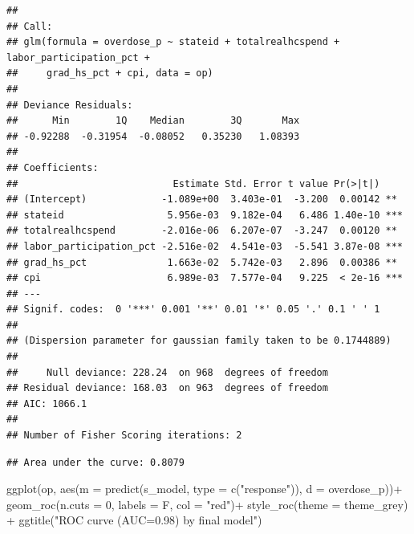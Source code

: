 \documentclass[
]{article}
\newenvironment{Shaded}{\begin{snugshade}}{\end{snugshade}}
\newcommand{\AttributeTok}[1]{\textcolor[rgb]{0.77,0.63,0.00}{#1}}
\newcommand{\DecValTok}[1]{\textcolor[rgb]{0.00,0.00,0.81}{#1}}
\newcommand{\FunctionTok}[1]{\textcolor[rgb]{0.00,0.00,0.00}{#1}}
\newcommand{\NormalTok}[1]{#1}
\newcommand{\OtherTok}[1]{\textcolor[rgb]{0.56,0.35,0.01}{#1}}
\newcommand{\SpecialCharTok}[1]{\textcolor[rgb]{0.00,0.00,0.00}{#1}}
\newcommand{\StringTok}[1]{\textcolor[rgb]{0.31,0.60,0.02}{#1}}
\begin{document}
\begin{verbatim}
## 
## Call:
## glm(formula = overdose_p ~ stateid + totalrealhcspend + labor_participation_pct + 
##     grad_hs_pct + cpi, data = op)
## 
## Deviance Residuals: 
##      Min        1Q    Median        3Q       Max  
## -0.92288  -0.31954  -0.08052   0.35230   1.08393  
## 
## Coefficients:
##                           Estimate Std. Error t value Pr(>|t|)    
## (Intercept)             -1.089e+00  3.403e-01  -3.200  0.00142 ** 
## stateid                  5.956e-03  9.182e-04   6.486 1.40e-10 ***
## totalrealhcspend        -2.016e-06  6.207e-07  -3.247  0.00120 ** 
## labor_participation_pct -2.516e-02  4.541e-03  -5.541 3.87e-08 ***
## grad_hs_pct              1.663e-02  5.742e-03   2.896  0.00386 ** 
## cpi                      6.989e-03  7.577e-04   9.225  < 2e-16 ***
## ---
## Signif. codes:  0 '***' 0.001 '**' 0.01 '*' 0.05 '.' 0.1 ' ' 1
## 
## (Dispersion parameter for gaussian family taken to be 0.1744889)
## 
##     Null deviance: 228.24  on 968  degrees of freedom
## Residual deviance: 168.03  on 963  degrees of freedom
## AIC: 1066.1
## 
## Number of Fisher Scoring iterations: 2
\end{verbatim}

\begin{Shaded}
\end{Shaded}

\begin{verbatim}
## Area under the curve: 0.8079
\end{verbatim}

\begin{Shaded}
\begin{Highlighting}[]
\FunctionTok{ggplot}\NormalTok{(op, }\FunctionTok{aes}\NormalTok{(}\AttributeTok{m =} \FunctionTok{predict}\NormalTok{(s\_model, }\AttributeTok{type =} \FunctionTok{c}\NormalTok{(}\StringTok{"response"}\NormalTok{)), }\AttributeTok{d =}\NormalTok{ overdose\_p))}\SpecialCharTok{+} \FunctionTok{geom\_roc}\NormalTok{(}\AttributeTok{n.cuts =} \DecValTok{0}\NormalTok{, }\AttributeTok{labels =}\NormalTok{ F, }\AttributeTok{col =} \StringTok{"red"}\NormalTok{)}\SpecialCharTok{+} \FunctionTok{style\_roc}\NormalTok{(}\AttributeTok{theme =}\NormalTok{ theme\_grey) }\SpecialCharTok{+} \FunctionTok{ggtitle}\NormalTok{(}\StringTok{"ROC curve (AUC=0.98) by final model"}\NormalTok{)}
\end{Highlighting}
\end{Shaded}
\end{document}
